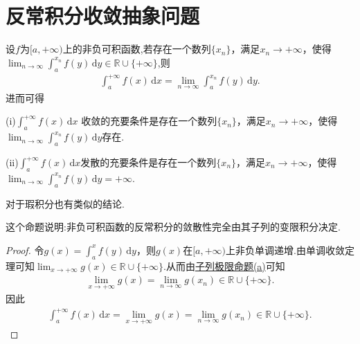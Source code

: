 \documentclass[../../main.tex]{subfiles}
\begin{document}
\section{反常积分收敛抽象问题}

\begin{proposition}\label{proposition:反常积分收敛的基本结论2}
设$f$为$[a,+\infty)$上的非负可积函数,若存在一个数列$\{x_n\}$，满足$x_n\to+\infty$，使得$\lim_{n\to\infty}\int_a^{x_n}f(y)\,\mathrm{d}y\in \mathbb{R}\cup \{+\infty\}$,则
\begin{align*}
\int_a^{+\infty}f(x)\,\mathrm{d}x=\lim_{n\to\infty}\int_a^{x_n}f(y)\,\mathrm{d}y.
\end{align*}
进而可得

(i)$\int_a^{+\infty}f(x)\,\mathrm{d}x$ 收敛的充要条件是存在一个数列$\{x_n\}$，满足$x_n\to+\infty$，使得$\lim_{n\to\infty}\int_a^{x_n}f(y)\,\mathrm{d}y$存在.

(ii)$\int_a^{+\infty}f(x)\,\mathrm{d}x$发散的充要条件是存在一个数列$\{x_n\}$，满足$x_n\to+\infty$，使得$\lim_{n\to\infty}\int_a^{x_n}f(y)\,\mathrm{d}y=+\infty$.
\end{proposition}
\begin{remark}
对于瑕积分也有类似的结论.
\end{remark}
\begin{note}
这个命题说明:非负可积函数的反常积分的敛散性完全由其子列的变限积分决定.
\end{note}
\begin{proof}
令$g(x)=\int_a^xf(y)\,\mathrm{d}y$，则$g(x)$在$[a,+\infty)$上非负单调递增.由单调收敛定理可知$\lim_{x\to+\infty}g(x)\in\mathbb{R}\cup\{+\infty\}$.从而由\hyperref[proposition:子列极限命题]{子列极限命题(a)}可知
\begin{align*}
\lim_{x\to+\infty}g(x)=\lim_{n\to\infty}g(x_n)\in \mathbb{R}\cup \{+\infty\}.
\end{align*}
因此
\begin{align*}
\int_a^{+\infty}f(x)\,\mathrm{d}x=\lim_{x\to+\infty}g(x)=\lim_{n\to\infty}g(x_n)\in \mathbb{R}\cup \{+\infty\}.
\end{align*}
\end{proof}
\end{document}
